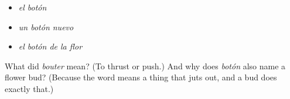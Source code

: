 \begin{itemize}
\raggedright
  \item \emph{el botón}
  \item \emph{un botón nuevo}
  \item \emph{el botón de la flor}
\end{itemize}

\begin{tcolorbox}[breakable,colback=teal!4,colframe=teal!35!black,title={Before you move on}]
What did \emph{bouter} mean? (To thrust or push.) And why does \emph{botón} also name a flower bud? (Because the word means a thing that juts out, and a bud does exactly that.)
\end{tcolorbox}
